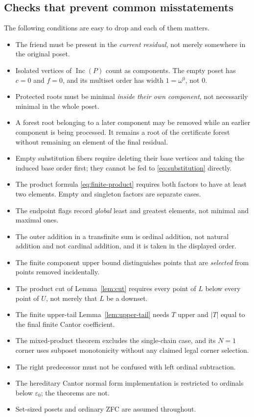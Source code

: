 \documentclass[11pt,letterpaper]{article}
\theoremstyle{definition}
\theoremstyle{remark}
\newcommand{\Inc}{\operatorname{Inc}}
\begin{document}
\subsection*{Checks that prevent common misstatements}
The following conditions are easy to drop and each of them matters.

\begin{itemize}
\item The friend must be present in the \emph{current residual}, not merely
somewhere in the original poset.
\item Isolated vertices of $\Inc(P)$ count as components. The empty poset
has $c=0$ and $f=0$, and its multiset order has width $1=\omega^0$, not $0$.
\item Protected roots must be minimal \emph{inside their own component},
not necessarily minimal in the whole poset.
\item A forest root belonging to a later component may be removed while an
earlier component is being processed. It remains a root of the certificate
forest without remaining an element of the final residual.
\item Empty substitution fibers require deleting their base vertices and
taking the induced base order first; they cannot be fed to
\eqref{eq:substitution} directly.
\item The product formula \eqref{eq:finite-product} requires both factors to
have at least two elements. Empty and singleton factors are separate cases.
\item The endpoint flags record \emph{global} least and greatest elements,
not minimal and maximal ones.
\item The outer addition in a transfinite sum is ordinal addition, not
natural addition and not cardinal addition, and it is taken in the displayed
order.
\item The finite component upper bound distinguishes points that are
\emph{selected} from points removed incidentally.
\item The product cut of Lemma~\ref{lem:cut} requires every point of $L$
below every point of $U$, not merely that $L$ be a downset.
\item The finite upper-tail Lemma~\ref{lem:upper-tail} needs $T$ upper and
$|T|$ equal to the final finite Cantor coefficient.
\item The mixed-product theorem excludes the single-chain case, and its
$N=1$ corner uses subposet monotonicity without any claimed legal corner
selection.
\item The right predecessor must not be confused with left ordinal
subtraction.
\item The hereditary Cantor normal form implementation is restricted to
ordinals below $\varepsilon_0$; the theorems are not.
\item Set-sized posets and ordinary ZFC are assumed throughout.
\end{itemize}
\end{document}

